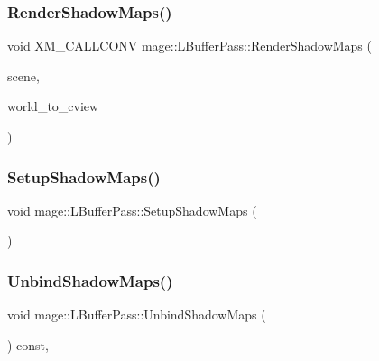 \subsubsection{\texorpdfstring{Render\+Shadow\+Maps()}{RenderShadowMaps()}}
{\footnotesize\ttfamily void X\+M\+\_\+\+C\+A\+L\+L\+C\+O\+NV mage\+::\+L\+Buffer\+Pass\+::\+Render\+Shadow\+Maps (\begin{DoxyParamCaption}\item[{const \hyperlink{classmage_1_1_scene}{Scene} \&}]{scene,  }\item[{F\+X\+M\+M\+A\+T\+R\+IX}]{world\+\_\+to\+\_\+cview }\end{DoxyParamCaption})\hspace{0.3cm}{\ttfamily [private]}}

\hypertarget{classmage_1_1_l_buffer_pass_ac646805ddf0eb4d81be3e29fec539fc5}{}\label{classmage_1_1_l_buffer_pass_ac646805ddf0eb4d81be3e29fec539fc5} 
\subsubsection{\texorpdfstring{Setup\+Shadow\+Maps()}{SetupShadowMaps()}}
{\footnotesize\ttfamily void mage\+::\+L\+Buffer\+Pass\+::\+Setup\+Shadow\+Maps (\begin{DoxyParamCaption}{ }\end{DoxyParamCaption})\hspace{0.3cm}{\ttfamily [private]}}

\hypertarget{classmage_1_1_l_buffer_pass_af7abbf24eb7d20d9604beca5baa71f20}{}\label{classmage_1_1_l_buffer_pass_af7abbf24eb7d20d9604beca5baa71f20} 
\subsubsection{\texorpdfstring{Unbind\+Shadow\+Maps()}{UnbindShadowMaps()}}
{\footnotesize\ttfamily void mage\+::\+L\+Buffer\+Pass\+::\+Unbind\+Shadow\+Maps (\begin{DoxyParamCaption}{ }\end{DoxyParamCaption}) const\hspace{0.3cm}{\ttfamily [private]}, {\ttfamily [noexcept]}}



